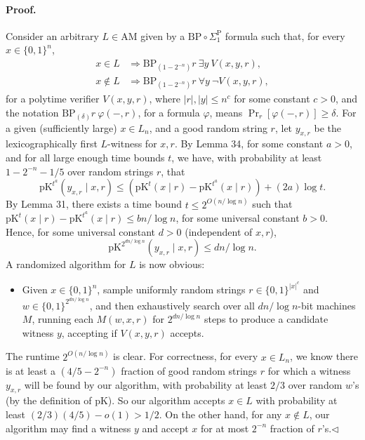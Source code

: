 \documentclass[10pt,a4paper]{article}
\begin{document}
\paragraph{Proof.} Consider an arbitrary $L\in\mathrm{AM}$ given by a $\mathrm{BP}\circ\Sigma_1^{\mathrm P}$ formula such that, for every $x\in\{0,1\}^n$,
\begin{align*}
x\in L&\Longrightarrow\mathrm{BP}_{(1-2^{-n})}r\ \exists y\ V(x,y,r),\\
x\notin L&\Longrightarrow\mathrm{BP}_{(1-2^{-n})}r\ \forall y\ \neg V(x,y,r),
\end{align*}
for a polytime verifier $V(x,y,r)$, where $|r|,|y|\leq n^c$ for some constant $c>0$, and the notation $\mathrm{BP}_{(\delta)}r\ \varphi(-,r)$, for a formula $\varphi$, means $\Pr_r[\varphi(-,r)]\geq\delta$.
For a given (sufficiently large) $x\in L_n$, and a good random string $r$, let $y_{x,r}$ be the lexicographically first $L$-witness for $x,r$. By Lemma 34, for some constant $a>0$, and for all large enough time bounds $t$, we have, with probability at least $1-2^{-n}-1/5$ over random strings $r$, that
\[\mathrm{pK}^{t^a}(y_{x,r}\mid x,r)\leq(\mathrm{pK}^t(x\mid r)-\mathrm{pK}^{t^a}(x\mid r))+(2a)\log t.\]
By Lemma 31, there exists a time bound $t\leq2^{O(n/\log n)}$ such that $\mathrm{pK}^t(x\mid r)-\mathrm{pK}^{t^a}(x\mid r)\leq bn/\log n$, for some universal constant $b>0$. Hence, for some universal constant $d>0$ (independent of $x,r$),
\[\mathrm{pK}^{2^{dn/\log n}}(y_{x,r}\mid x,r)\leq dn/\log n.\]
A randomized algorithm for $L$ is now obvious:
\begin{itemize}
\item Given $x\in\{0,1\}^n$, sample uniformly random strings $r\in\{0,1\}^{|x|^c}$ and $w\in\{0,1\}^{2^{dn/\log n}}$, and then exhaustively search over all $dn/\log n$-bit machines $M$, running each $M(w,x,r)$ for $2^{dn/\log n}$ steps to produce a candidate witness $y$, accepting if $V(x,y,r)$ accepts.
\end{itemize}
The runtime $2^{O(n/\log n)}$ is clear. For correctness, for every $x\in L_n$, we know there is at least a $(4/5-2^{-n})$ fraction of good random strings $r$ for which a witness $y_{x,r}$ will be found by our algorithm, with probability at least $2/3$ over random $w$'s (by the definition of pK). So our algorithm accepts $x\in L$ with probability at least $(2/3)(4/5)-o(1)>1/2$. On the other hand, for any $x\notin L$, our algorithm may find a witness $y$ and accept $x$ for at most $2^{-n}$ fraction of $r$'s.\hfill$\triangleleft$
\end{document}
